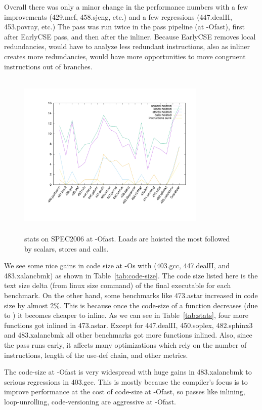 \documentclass[sigplan,10pt,review,anonymous]{acmart}\settopmatter{printfolios=true,printccs=false,printacmref=false}
\begin{document}
Overall there was only a minor change in the performance numbers with a few improvements 
(429.mcf, 458.sjeng, etc.) and a few regressions (447.dealII, 453.povray,
etc.) The \gcm{} pass was run twice in the pass pipeline (at -Ofast),
first after EarlyCSE pass, and then after the inliner. Because EarlyCSE removes
local redundancies, \GCM{} would have to analyze less redundant instructions, also
as inliner creates more redundancies, \GCM{} would have more opportunities to move
congruent instructions out of branches.

\begin{figure}[h!]
  \includegraphics[width=0.8\textwidth,height=8cm]{gcm-stats.pdf}
  \vspace*{-1.5cm}
\caption{\GCM{} stats on SPEC2006 at -Ofast. Loads are hoisted the most followed
  by scalars, stores and calls.}
\label{tab:code-motion-metric}
\end{figure}

We see some nice gains in code size at -Os with \gcm{} (403.gcc, 447.dealII, and
483.xalancbmk) as shown in Table~\ref{tab:code-size}.  The code size listed here
is the text size delta (from linux size command) of the final executable for
each benchmark.  On the other hand, some benchmarks like 473.astar increased in
code size by almost 2\%. This is because once the code-size of a function
decreases (due to \GCM{}) it becomes cheaper to inline. As we can see in
Table~\ref{tab:stats}, four more functions got inlined in 473.astar. Except for
447.dealII, 450.soplex, 482.sphinx3 and 483.xalancbmk all other benchmarks got
more functions inlined. Also, since the pass runs early, it affects many
optimizations which rely on the number of instructions, length of the use-def
chain, and other metrics.

The code-size at -Ofast is very widespread with huge gains in 483.xalancbmk to
serious regressions in 403.gcc. This is mostly because the compiler's focus is
to improve performance at the cost of code-size at -Ofast, so passes like
inlining, loop-unrolling, code-versioning are aggressive at -Ofast.
\end{document}
